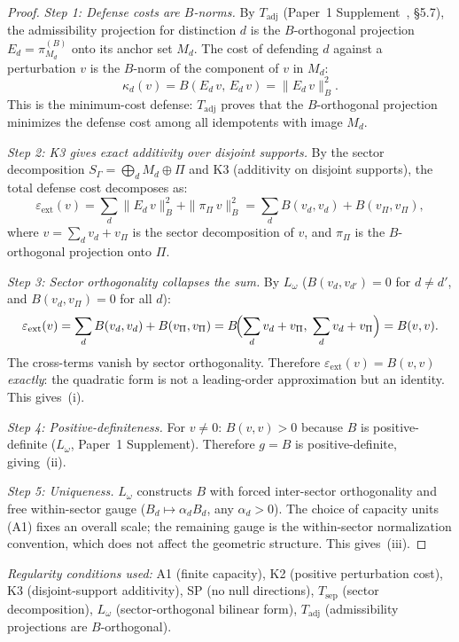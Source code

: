 \documentclass[11pt]{article}
\theoremstyle{definition}
\begin{document}
\begin{proof}
\textit{Step 1: Defense costs are $B$-norms.}\quad
By $T_{\mathrm{adj}}$ (Paper~1 Supplement~\cite{BrookeSupplement}, \S5.7),
the admissibility projection for distinction $d$ is the $B$-orthogonal
projection $E_d = \pi_{M_d}^{(B)}$ onto its anchor set $M_d$.  The cost
of defending $d$ against a perturbation $v$ is the $B$-norm of the
component of $v$ in $M_d$:
\[
  \kappa_d(v) = B(E_d\, v,\, E_d\, v) = \|E_d\, v\|_B^2.
\]
This is the minimum-cost defense: $T_{\mathrm{adj}}$ proves that the
$B$-orthogonal projection minimizes the defense cost among all
idempotents with image $M_d$.

\textit{Step 2: K3 gives exact additivity over disjoint supports.}\quad
By the sector decomposition $S_\Gamma = \bigoplus_d M_d \oplus \Pi$ and
K3 (additivity on disjoint supports), the total defense cost decomposes
as:
\[
  \varepsilon_{\mathrm{ext}}(v)
  = \sum_{d} \|E_d\, v\|_B^2 + \|\pi_\Pi\, v\|_B^2
  = \sum_{d} B(v_d, v_d) + B(v_\Pi, v_\Pi),
\]
where $v = \sum_d v_d + v_\Pi$ is the sector decomposition of $v$,
and $\pi_\Pi$ is the $B$-orthogonal projection onto $\Pi$.

\textit{Step 3: Sector orthogonality collapses the sum.}\quad
By $L_\omega$ ($B(v_d, v_{d'}) = 0$ for $d \ne d'$, and
$B(v_d, v_\Pi) = 0$ for all $d$):
\[
  \varepsilon_{\mathrm{ext}}(v)
  = \sum_d B(v_d, v_d) + B(v_\Pi, v_\Pi)
  = B\!\Bigl(\sum_d v_d + v_\Pi,\; \sum_d v_d + v_\Pi\Bigr)
  = B(v, v).
\]
The cross-terms vanish by sector orthogonality.  Therefore
$\varepsilon_{\mathrm{ext}}(v) = B(v,v)$ \emph{exactly}: the quadratic
form is not a leading-order approximation but an identity.  This
gives~(i).

\textit{Step 4: Positive-definiteness.}\quad
For $v \ne 0$: $B(v,v) > 0$ because $B$ is positive-definite
($L_\omega$, Paper~1 Supplement).  Therefore $g = B$ is
positive-definite, giving~(ii).

\textit{Step 5: Uniqueness.}\quad
$L_\omega$ constructs $B$ with forced inter-sector orthogonality and
free within-sector gauge ($B_d \mapsto \alpha_d B_d$, any $\alpha_d > 0$).
The choice of capacity units (A1) fixes an overall scale; the remaining
gauge is the within-sector normalization convention, which does not
affect the geometric structure.  This gives~(iii).
\end{proof}

\smallskip\noindent\textit{Regularity conditions used:}
A1 (finite capacity), K2 (positive perturbation cost), K3 (disjoint-support
additivity), SP (no null directions), $T_{\mathrm{sep}}$ (sector
decomposition), $L_\omega$ (sector-orthogonal bilinear form),
$T_{\mathrm{adj}}$ (admissibility projections are $B$-orthogonal).
\end{document}
